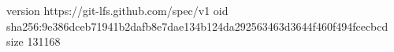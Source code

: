 version https://git-lfs.github.com/spec/v1
oid sha256:9e386dceb71941b2dafb8e7dae134b124da292563463d3644f460f494fcecbcd
size 131168
